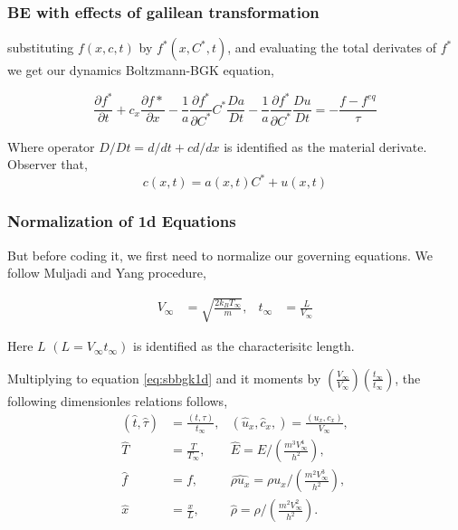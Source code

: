 \begin{frame}
	\frametitle{BE with effects of galilean transformation}
	substituting $f(x,c,t)$ by $f^*(x,C^*,t)$, and evaluating the total derivates of $f^*$ we get our dynamics Boltzmann-BGK equation,
	
	\begin{equation}
	\frac{\partial f^*}{\partial t} + c_x \frac{\partial f*}{\partial x} 
		- \frac{1}{a} \frac{\partial f^*}{\partial C^*} C^* \frac{Da}{Dt}
		- \frac{1}{a} \frac{\partial f^*}{\partial C^*} \frac{Du}{Dt}
		= -\frac{f - f^{eq}}{\tau}
	\label{eq:sbbgk1d}
	\end{equation}
	
	Where operator $D/Dt = d/dt + c d/dx$ is identified as the material derivate. Observer that, 
	\begin{equation}
		c(x,t) = a(x,t) C^* + u(x,t)
	\end{equation}	
\end{frame}

\begin{frame}
	\frametitle{Normalization of 1d Equations}
	But before coding it, we first need to normalize our governing equations. We follow Muljadi and Yang \cite{Yang2013} procedure,
	
	\begin{align*}
	V_\infty &= \sqrt{\frac{2k_BT_\infty}{m}}, & t_\infty &= \frac{L}{V_\infty}
	\end{align*}
	
	Here $L$ $(L = V_\infty t_\infty)$ is identified as the characterisitc length.
\end{frame}

\begin{frame}
	Multiplying to equation \ref{eq:sbbgk1d} and it moments by $(\frac{V_\infty}{V_\infty})(\frac{t_\infty}{t_\infty})$, the following dimensionles relations follows,
	\begin{align*}
	(\hat t, \hat \tau) &= \frac{(t,\tau)}{t_\infty}, & (\hat u_x,\hat c_x,) = \frac{(u_x,c_x)}{V_\infty}, \\
	\hat T &= \frac{T}{T_\infty}, & \hat E = E / \left(\frac{m^3V_\infty^4}{h^2} \right ), \\
	\hat f &= f, &\hat {\rho u_x} = \rho u_x / \left(\frac{m^2V_\infty^3}{h^2} \right ), \\
	\hat x &= \frac{x}{L}, &\hat \rho = \rho / \left(\frac{m^2V_\infty^2}{h^2} \right ).
	\end{align*}
\end{frame}

